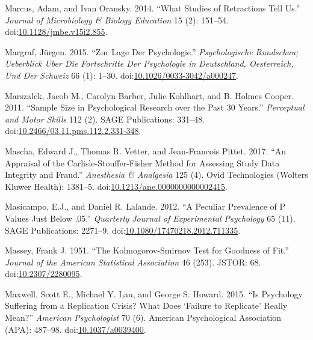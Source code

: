 \documentclass[a5paper]{book}
\begin{document}
\hypertarget{ref-doi:10.1128ux2fjmbe.v15i2.855}{}
Marcus, Adam, and Ivan Oransky. 2014. ``What Studies of Retractions Tell
Us.'' \emph{Journal of Microbiology \& Biology Education} 15 (2):
151--54.
doi:\href{https://doi.org/10.1128/jmbe.v15i2.855}{10.1128/jmbe.v15i2.855}.

\hypertarget{ref-doi:10.1026ux2f0033-3042ux2fa000247}{}
Margraf, Jürgen. 2015. ``Zur Lage Der Psychologie.''
\emph{Psychologische Rundschau; Ueberblick Uber Die Fortschritte Der
Psychologie in Deutschland, Oesterreich, Und Der Schweiz} 66 (1): 1--30.
doi:\href{https://doi.org/10.1026/0033-3042/a000247}{10.1026/0033-3042/a000247}.

\hypertarget{ref-doi:10.2466ux2f03.11.pms.112.2.331-348}{}
Marszalek, Jacob M., Carolyn Barber, Julie Kohlhart, and B. Holmes
Cooper. 2011. ``Sample Size in Psychological Research over the Past 30
Years.'' \emph{Perceptual and Motor Skills} 112 (2). SAGE Publications:
331--48.
doi:\href{https://doi.org/10.2466/03.11.pms.112.2.331-348}{10.2466/03.11.pms.112.2.331-348}.

\hypertarget{ref-doi:10.1213ux2fane.0000000000002415}{}
Mascha, Edward J., Thomas R. Vetter, and Jean-Francois Pittet. 2017.
``An Appraisal of the Carlisle-Stouffer-Fisher Method for Assessing
Study Data Integrity and Fraud.'' \emph{Anesthesia \& Analgesia} 125
(4). Ovid Technologies (Wolters Kluwer Health): 1381--5.
doi:\href{https://doi.org/10.1213/ane.0000000000002415}{10.1213/ane.0000000000002415}.

\hypertarget{ref-doi:10.1080ux2f17470218.2012.711335}{}
Masicampo, E.J., and Daniel R. Lalande. 2012. ``A Peculiar Prevalence of
P Values Just Below .05.'' \emph{Quarterly Journal of Experimental
Psychology} 65 (11). SAGE Publications: 2271--9.
doi:\href{https://doi.org/10.1080/17470218.2012.711335}{10.1080/17470218.2012.711335}.

\hypertarget{ref-doi:10.2307ux2f2280095}{}
Massey, Frank J. 1951. ``The Kolmogorov-Smirnov Test for Goodness of
Fit.'' \emph{Journal of the American Statistical Association} 46 (253).
JSTOR: 68. doi:\href{https://doi.org/10.2307/2280095}{10.2307/2280095}.

\hypertarget{ref-doi:10.1037ux2fa0039400}{}
Maxwell, Scott E., Michael Y. Lau, and George S. Howard. 2015. ``Is
Psychology Suffering from a Replication Crisis? What Does `Failure to
Replicate' Really Mean?'' \emph{American Psychologist} 70 (6). American
Psychological Association (APA): 487--98.
doi:\href{https://doi.org/10.1037/a0039400}{10.1037/a0039400}.
\end{document}
